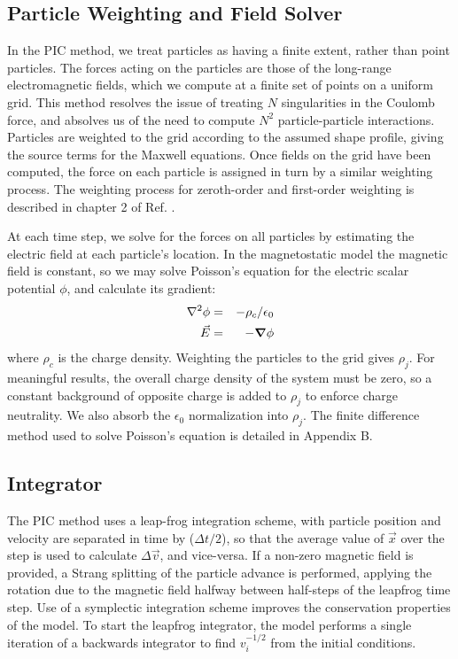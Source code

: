 \documentclass[%
 reprint,
 amsmath,amssymb,
 aps,
]{revtex4-2}
\begin{document}
\subsection{Particle Weighting and Field Solver}
In the PIC method, we treat particles as having a finite extent, rather than point particles. The forces acting on the particles are those of the long-range electromagnetic fields, which we compute at a finite set of points on a uniform grid. This method resolves the issue of treating $N$ singularities in the Coulomb force, and absolves us of the need to compute $N^2$ particle-particle interactions. Particles are weighted to the grid according to the assumed shape profile, giving the source terms for the Maxwell equations. Once fields on the grid have been computed, the force on each particle is assigned in turn by a similar weighting process. The weighting process for zeroth-order and first-order weighting is described in chapter 2 of Ref. \cite{BirdsallCharlesK1991Ppvc}.

At each time step, we solve for the forces on all particles by estimating the electric field at each particle's location. In the magnetostatic model the magnetic field is constant, so we may solve Poisson's equation for the electric scalar potential $\phi$, and calculate its gradient:
\begin{eqnarray}
\nabla ^2 \phi & = & - \rho_c / \epsilon_0 \\
\vec E & = & - \grad \phi
\end{eqnarray}
where $\rho_c$ is the charge density. Weighting the particles to the grid gives $\rho_j$. For meaningful results, the overall charge density of the system must be zero, so a constant background of opposite charge is added to $\rho_j$ to enforce charge neutrality. We also absorb the $\epsilon_0$ normalization into $\rho_j$. The finite difference method used to solve Poisson's equation is detailed in Appendix B.
\subsection{Integrator}
The PIC method uses a leap-frog integration scheme, with particle position and velocity are separated in time by ($\Delta t/2$), so that the average value of $\vec x$ over the step is used to calculate $\Delta \vec v$, and vice-versa. If a non-zero magnetic field is provided, a Strang splitting of the particle advance is performed, applying the rotation due to the magnetic field halfway between half-steps of the leapfrog time step. Use of a symplectic integration scheme improves the conservation properties of the model. To start the leapfrog integrator, the model performs a single iteration of a backwards integrator to find $v_i ^{-1/2}$ from the initial conditions.
\end{document}
